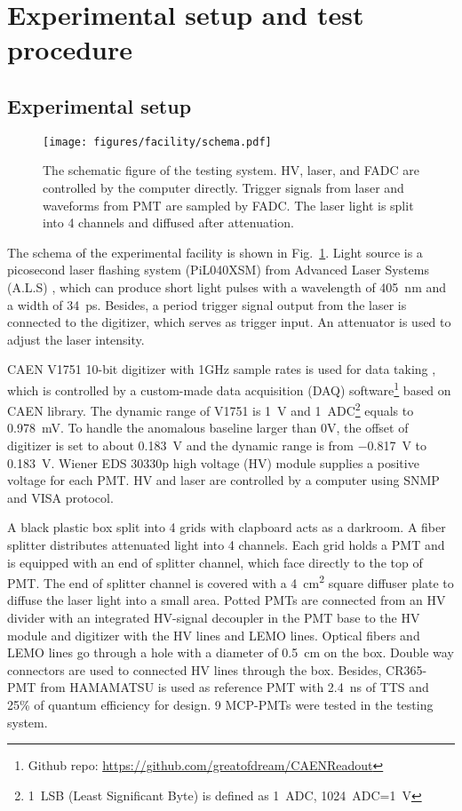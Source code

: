 \section{Experimental setup and test procedure}
\label{SetUp}
\subsection{Experimental setup}
\label{sec:setup}
\begin{figure}[!htbp]
    \centering
    \texttt{[image: figures/facility/schema.pdf]}
    \caption{The schematic figure of the testing system. HV, laser, and FADC are controlled by the computer directly. Trigger signals from laser and waveforms from PMT are sampled by FADC. The laser light is split into 4 channels and diffused after attenuation.}
    \label{fig:facility}
\end{figure}

The schema of the experimental facility is shown in Fig.~\ref{fig:facility}. Light source is a picosecond laser flashing system (PiL040XSM) from Advanced Laser Systems (A.L.S) \cite{NTKLaser}, which can produce short light pulses with a wavelength of \SI{405}{nm} and a width of \SI{34}{ps}. Besides, a period trigger signal output from the laser is connected to the digitizer, which serves as trigger input. An attenuator is used to adjust the laser intensity.

CAEN V1751 10-bit digitizer with 1GHz sample rates is used for data taking \cite{CAENV1751}, which is controlled by a custom-made data acquisition (DAQ) software\footnote{Github repo: \url{https://github.com/greatofdream/CAENReadout}} based on CAEN library. The dynamic range of V1751 is \SI{1}{V} and \SI{1}{ADC}\footnote{\SI{1}{LSB} (Least Significant Byte) is defined as \SI{1}{ADC}, \SI{1024}{ADC}=\SI{1}{V}} equals to \SI{0.978}{mV}. To handle the anomalous baseline larger than 0V, the offset of digitizer is set to about \SI{0.183}{V} and the dynamic range is from \SI{-0.817}{V} to \SI{0.183}{V}. Wiener EDS 30330p high voltage (HV) module \cite{WIENERHV} supplies a positive voltage for each PMT. HV and laser are controlled by a computer using SNMP \cite{SNMP} and VISA \cite{VISA} protocol.

A black plastic box split into 4 grids with clapboard acts as a darkroom. A fiber splitter %
distributes attenuated light into 4 channels. Each grid holds a PMT and is equipped with an end of splitter channel, which face directly to the top of PMT. The end of splitter channel is covered with a \SI{4}{cm\tothe{2}} square diffuser plate to diffuse the laser light into a small area. Potted PMTs are connected from an HV divider with an integrated HV-signal decoupler in the PMT base to the HV module and digitizer with the HV lines and LEMO lines. Optical fibers and LEMO lines go through a hole with a diameter of \SI{0.5}{cm} on the box. Double way connectors are used to connected HV lines through the box. Besides, CR365-PMT \cite{BJBS} from HAMAMATSU is used as reference PMT with \SI{2.4}{ns} of TTS and 25\% of quantum efficiency for design.%
9 MCP-PMTs were tested in the testing system.

